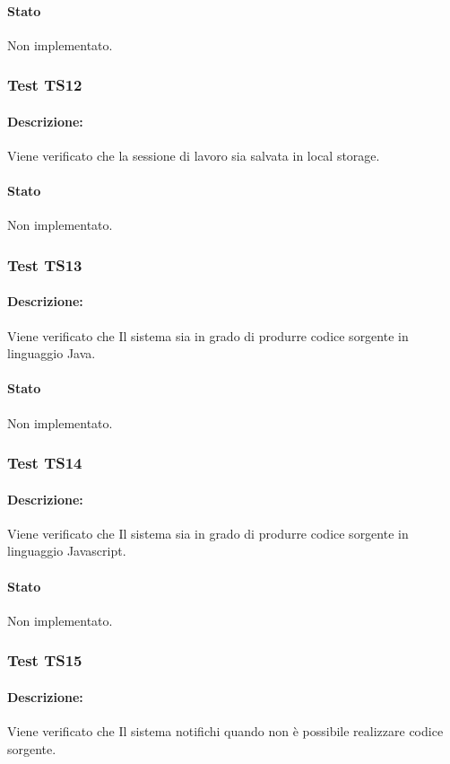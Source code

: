 \documentclass[../PianoDiQualifica.tex]{subfiles}
\begin{document}
	\paragraph{Stato} Non implementato.
	
	\subsubsection{Test TS12} 
	\paragraph{Descrizione:} Viene verificato che la sessione di lavoro sia salvata in local storage.
	\paragraph{Stato} Non implementato.
	
	\subsubsection{Test TS13} 
	\paragraph{Descrizione:} Viene verificato che Il sistema sia in grado di
	produrre codice sorgente in linguaggio Java.
	\paragraph{Stato} Non implementato.
	
	\subsubsection{Test TS14} 
	\paragraph{Descrizione:} Viene verificato che Il sistema sia in grado di
	produrre codice sorgente in linguaggio Javascript.
	\paragraph{Stato} Non implementato.
	
	\subsubsection{Test TS15} 
	\paragraph{Descrizione:} Viene verificato che Il sistema notifichi quando non è possibile	realizzare codice sorgente.
\end{document}
